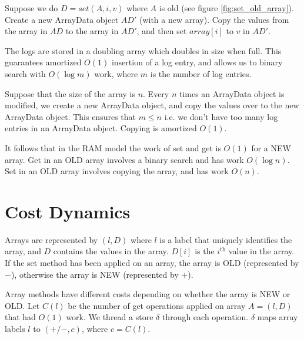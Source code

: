\documentclass[preprint]{sigplanconf}
\begin{document}
Suppose we do $D = set(A, i,v)$ where $A$ is old (see figure \ref{fig:set_old_array}). Create a new ArrayData object $AD'$ (with a new array). Copy the values from the array in $AD$ to the array in $AD'$, and then set $array[i]$ to $v$ in $AD'$.

The logs are stored in a doubling array which doubles in size when full. This guarantees amortized $O(1)$ insertion of a log entry, and allows us to binary search with $O(\log{m})$ work, where $m$ is the number of log entries.

Suppose that the size of the array is $n$. Every $n$ times an ArrayData object is modified, we create a new ArrayData object, and copy the values over to the new ArrayData object. This ensures that $m \leq n$ i.e. we don't have too many log entries in an ArrayData object. Copying is amortized $O(1)$.

It follows that in the RAM model the work of set and get is $O(1)$ for a NEW array. Get in an OLD array involves a binary search and has work $O(\log{n})$. Set in an OLD array involves copying the array, and has work $O(n)$.

\section{Cost Dynamics}

Arrays are represented by $(l, D)$ where $l$ is a label that uniquely identifies the array, and $D$ contains the values in the array. $D[i]$ is the $i^{\text{th}}$ value in the array. If the set method has been applied on an array, the array is OLD (represented by $-$), otherwise the array is NEW (represented by $+$). 

Array methods have different costs depending on whether the array is NEW or OLD. Let $C(l)$ be the number of get operations applied on array $A = (l, D)$ that had $O(1)$ work. We thread a store $\delta$ through each operation. $\delta$ maps array labels $l$ to $(+/-, c)$, where $c = C(l)$.
\end{document}
